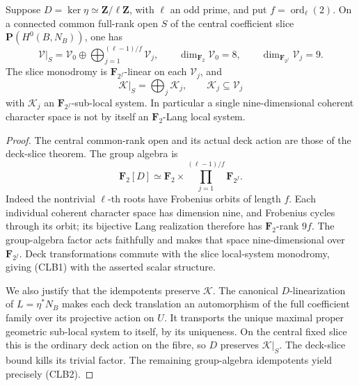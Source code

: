 \begin{proposition}
\label{prop:cyclic-Lang-character-cycle-decomposition}
Suppose \(D=\ker\eta\simeq\mathbf Z/\ell\mathbf Z\), with
\(\ell\) an odd prime, and put \(f=\operatorname{ord}_\ell(2)\).
On a connected common full-rank open \(S\) of the central
coefficient slice \(\mathbf P(H^0(B,N_B))\), one has
\[
 \mathcal V|_S=\mathcal V_0\oplus\bigoplus_{j=1}^{(\ell-1)/f}
 \mathcal V_j,\qquad
 \dim_{\mathbf F_2}\mathcal V_0=8,\qquad
 \dim_{\mathbf F_{2^f}}\mathcal V_j=9.
 \tag{CLB1}
\]
The slice monodromy is \(\mathbf F_{2^f}\)-linear on each
\(\mathcal V_j\), and
\[
                 \mathcal K|_S=\bigoplus_j\mathcal K_j,
                 \qquad \mathcal K_j\subseteq\mathcal V_j
 \tag{CLB2}
\]
with \(\mathcal K_j\) an \(\mathbf F_{2^f}\)-sub-local system.
In particular a single nine-dimensional coherent character space
is not by itself an \(\mathbf F_2\)-Lang local system.
\end{proposition}
\begin{proof}
The central common-rank open and its actual deck action are those
of the deck-slice theorem. The group algebra is
\[
 \mathbf F_2[D]\simeq\mathbf F_2\times
       \prod_{j=1}^{(\ell-1)/f}\mathbf F_{2^f}.
\]
Indeed the nontrivial \(\ell\)-th roots have Frobenius orbits
of length \(f\). Each individual coherent character space has
dimension nine, and Frobenius cycles through its orbit; its
bijective Lang realization therefore has \(\mathbf F_2\)-rank
\(9f\). The group-algebra factor acts faithfully and makes
that space nine-dimensional over \(\mathbf F_{2^f}\).
Deck transformations commute with the slice local-system monodromy,
giving (CLB1) with the asserted scalar structure.

We also justify that the idempotents preserve \(\mathcal K\).
The canonical \(D\)-linearization of \(L=\eta^*N_B\) makes
each deck translation an automorphism of the full coefficient
family over its projective action on \(U\). It transports the
unique maximal proper geometric sub-local system to itself, by
its uniqueness. On the central fixed slice this is the ordinary
deck action on the fibre, so \(D\) preserves \(\mathcal K|_S\).
The deck-slice bound kills its trivial factor. The remaining
group-algebra idempotents yield precisely (CLB2).
\end{proof}

